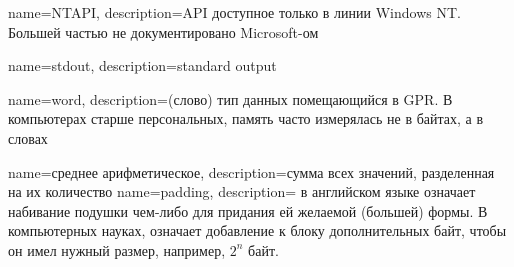 {
  name=NTAPI,
  description={\ac{API} доступное только в линии Windows NT. 
  Большей частью не документировано Microsoft-ом}
}

{
  name=stdout,
  description={standard output}
}

{
  name=word,
  description={(слово) тип данных помещающийся в \ac{GPR}. 
  В компьютерах старше персональных, память часто измерялась не в байтах, 
  а в словах}
}

{
  name=среднее арифметическое,
  description={сумма всех значений, разделенная на их количество}
}
{
  name=padding,
  description={ в английском языке означает набивание подушки чем-либо для придания ей желаемой (большей)
  формы. В компьютерных науках,  означает добавление к блоку дополнительных байт, чтобы он имел нужный
  размер, например, $2^n$ байт.}
}

